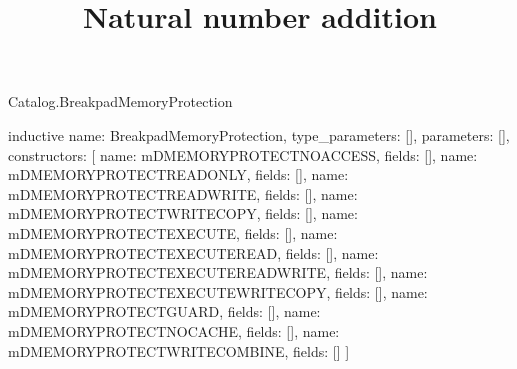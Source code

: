 \begin{lexlean}{Catalog.BreakpadMemoryProtection}
\title{Natural number addition}
\begin{semanticmodule}
inductive{
  name: BreakpadMemoryProtection,
  type_parameters: [],
  parameters: [],
  constructors: [
    {name: mDMEMORYPROTECTNOACCESS, fields: []},
    {name: mDMEMORYPROTECTREADONLY, fields: []},
    {name: mDMEMORYPROTECTREADWRITE, fields: []},
    {name: mDMEMORYPROTECTWRITECOPY, fields: []},
    {name: mDMEMORYPROTECTEXECUTE, fields: []},
    {name: mDMEMORYPROTECTEXECUTEREAD, fields: []},
    {name: mDMEMORYPROTECTEXECUTEREADWRITE, fields: []},
    {name: mDMEMORYPROTECTEXECUTEWRITECOPY, fields: []},
    {name: mDMEMORYPROTECTGUARD, fields: []},
    {name: mDMEMORYPROTECTNOCACHE, fields: []},
    {name: mDMEMORYPROTECTWRITECOMBINE, fields: []}
  ]
}
\end{semanticmodule}
\end{lexlean}
